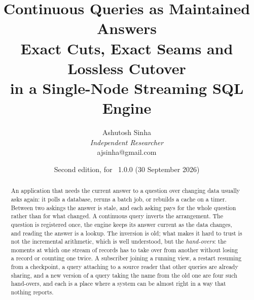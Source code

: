 \documentclass[11pt,a4paper]{article}
\title{\bfseries Continuous Queries as Maintained Answers\\[6pt]
{\large Exact Cuts, Exact Seams and Lossless Cutover\\
in a Single-Node Streaming SQL Engine}}
\author{Ashutosh Sinha\\[2pt]
{\normalsize\itshape Independent Researcher}\\[2pt]
{\normalsize\ttfamily ajsinha@gmail.com}}
\date{\normalsize Second edition, for \Pv\ 1.0.0 (30 September 2026)}
\renewcommand{\_}{\oldunderscore\allowbreak}
\begin{document}

\maketitle

\begin{abstract}
\noindent
An application that needs the current answer to a question over changing data usually asks again:
it polls a database, reruns a batch job, or rebuilds a cache on a timer. Between two askings the
answer is stale, and each asking pays for the whole question rather than for what changed. A
continuous query inverts the arrangement. The question is registered once, the engine keeps its
answer current as the data changes, and reading the answer is a lookup. The inversion is old; what
makes it hard to trust is not the incremental arithmetic, which is well understood, but the
\emph{hand-overs}: the moments at which one stream of records has to take over from another without
losing a record or counting one twice. A subscriber joining a running view, a restart resuming from
a checkpoint, a query attaching to a source reader that other queries are already sharing, and a new
version of a query taking the name from the old one are four such hand-overs, and each is a place
where a system can be almost right in a way that nothing reports.


\end{abstract}
\end{document}
